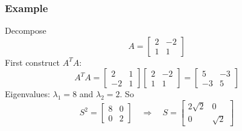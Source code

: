 \documentclass[10pt]{beamer}
\begin{document}
\begin{frame}
\frametitle{Example}
Decompose
\[
A = \begin{bmatrix}2 & -2\\ 1 & 1\end{bmatrix}
\]
First construct $A^T A$:
\[
A^TA 
= 
\begin{bmatrix}2 & 1\\ -2 & 1\end{bmatrix}
\begin{bmatrix}2 & -2\\ 1 & 1\end{bmatrix}
=
\begin{bmatrix}
5 & -3\\ -3 & 5
\end{bmatrix}
\]
Eigenvalues: $\lambda_1 = 8$ and $\lambda_2 = 2$.  So
\[
S^2=
\begin{bmatrix}
8 & 0\\ 0 & 2
\end{bmatrix}
\quad
\Rightarrow
\quad
S=
\begin{bmatrix}
2\sqrt{2} & 0\\ 0 & \sqrt{2}
\end{bmatrix}
\]
\end{frame}
\end{document}
